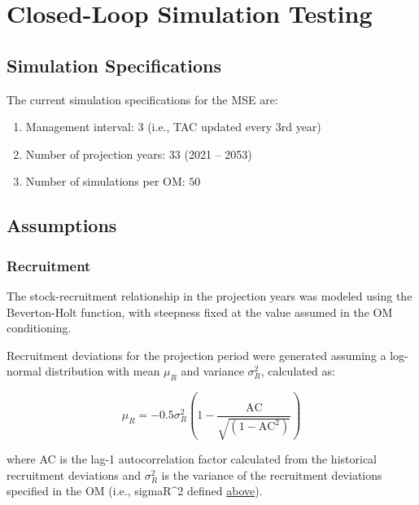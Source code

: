 \documentclass[
]{article}
\providecommand{\tightlist}{%
  \setlength{\itemsep}{0pt}\setlength{\parskip}{0pt}}
\begin{document}
\hypertarget{closed-loop-simulation-testing}{%
\section{Closed-Loop Simulation Testing}\label{closed-loop-simulation-testing}}

\hypertarget{simulation-specifications}{%
\subsection{Simulation Specifications}\label{simulation-specifications}}

The current simulation specifications for the MSE are:

\begin{enumerate}
\def\labelenumi{\arabic{enumi}.}
\tightlist
\item
  Management interval: 3 (i.e., TAC updated every 3rd year)
\item
  Number of projection years: 33 (2021 -- 2053)
\item
  Number of simulations per OM: \(50\)
\end{enumerate}

\hypertarget{assumptions}{%
\subsection{Assumptions}\label{assumptions}}

\hypertarget{recruitment}{%
\subsubsection{Recruitment}\label{recruitment}}

The stock-recruitment relationship in the projection years was modeled using the Beverton-Holt function, with steepness fixed at the value assumed in the OM conditioning.

Recruitment deviations for the projection period were generated assuming a log-normal distribution with mean \(\mu_R\) and variance \(\sigma_R^2\), calculated as:

\[\mu_R = -0.5\sigma_R^2\left(1-\frac{\text{AC}}{\sqrt{(1-\text{AC}^2)}}\right)\]

where AC is the lag-1 autocorrelation factor calculated from the historical recruitment deviations and \(\sigma_R^2\) is the variance of the recruitment deviations specified in the OM (i.e., sigmaR\^{}2 defined \protect\hyperlink{om-conditioning}{above}).
\end{document}
